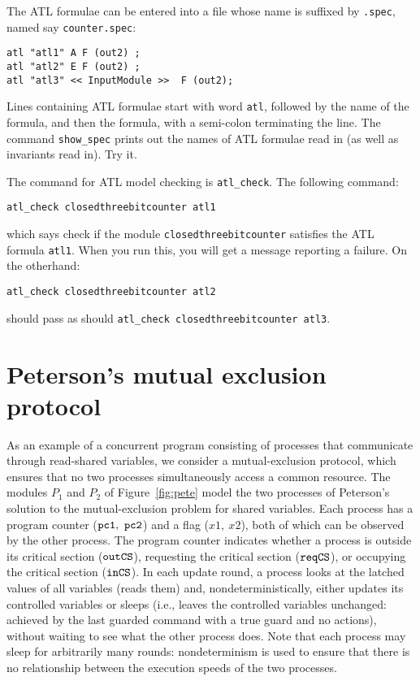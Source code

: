 The ATL formulae can be entered into a file whose name is suffixed
by {\tt .spec}, named say {\tt counter.spec}:

\begin{verbatim}
atl "atl1" A F (out2) ;
atl "atl2" E F (out2) ;
atl "atl3" << InputModule >>  F (out2); 
\end{verbatim}

Lines containing ATL formulae start with word {\tt atl}, followed by
the name of the formula, and then the formula, with a semi-colon
terminating the line. The command {\tt show\_spec} prints out the names
of ATL formulae read in (as well as invariants read in). Try it. 

The command for ATL model checking is {\tt atl\_check}. The following command:

\begin{verbatim}
atl_check closedthreebitcounter atl1
\end{verbatim}

\noindent
which says check if the module {\tt closedthreebitcounter} satisfies
the ATL formula {\tt atl1}. When you run this, you will get a message
reporting a failure. On the otherhand:

\begin{verbatim}
atl_check closedthreebitcounter atl2
\end{verbatim}

\noindent
should pass as should {\tt atl\_check closedthreebitcounter atl3}. 


\section{Peterson's mutual exclusion protocol}

As an example of a concurrent program consisting of processes that
communicate through read-shared variables, we consider a mutual-exclusion
protocol, which ensures that no two processes simultaneously access a common
resource.
The modules $P_1$ and $P_2$ of Figure~\ref{fig:pete} model the two processes
of Peterson's solution to the mutual-exclusion problem for shared variables.
Each process  has a program counter ($\mbox{\tt pc1},~\mbox{\tt pc2}$) and a flag ($x1,~x2$), both
of which can be observed by the other process.
The program counter indicates whether a process is outside its critical
section ($\mbox{\tt outCS}$), requesting the critical section
($\mbox{\tt reqCS}$), or occupying the critical section ($\mbox{\tt inCS}$).
In each update round, a process looks at the latched values of all
variables (reads them) and, nondeterministically, either updates its controlled variables or sleeps
(i.e., leaves the controlled variables unchanged: achieved by the last
guarded command with a true guard and no actions), without waiting to see
what the other process does.
Note that each process may sleep for arbitrarily many rounds:
nondeterminism is used to ensure that there is no relationship between the
execution speeds of the two processes.


